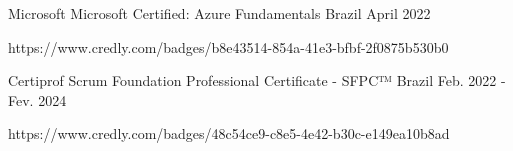 

\begin{cventries}

  \cventry
    {Microsoft} %
    {Microsoft Certified: Azure Fundamentals} %
    {Brazil} %
    {April 2022} %
    {
      \begin{cvitems} %
        \item {https://www.credly.com/badges/b8e43514-854a-41e3-bfbf-2f0875b530b0}
      \end{cvitems}
    }

  \cventry
    {Certiprof} %
    {Scrum Foundation Professional Certificate - SFPC™} %
    {Brazil} %
    {Feb. 2022 - Fev. 2024} %
    {
      \begin{cvitems} %
        \item {https://www.credly.com/badges/48c54ce9-c8e5-4e42-b30c-e149ea10b8ad}
      \end{cvitems}
    }

\end{cventries}
